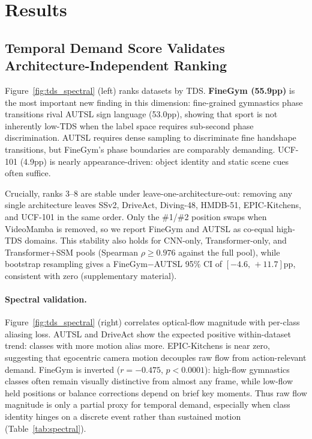 \documentclass[runningheads]{llncs}
\newcommand{\TDS}{\textsc{TDS}}
\begin{document}
\section{Results}
\label{sec:results}

\subsection{Temporal Demand Score Validates Architecture-Independent Ranking}
\label{sec:results_tds}

Figure~\ref{fig:tds_spectral} (left) ranks datasets by \TDS{}. \textbf{FineGym (55.9pp)} is the most important new finding in this dimension: fine-grained gymnastics phase transitions rival AUTSL sign language (53.0pp), showing that sport is not inherently low-\TDS{} when the label space requires sub-second phase discrimination. AUTSL requires dense sampling to discriminate fine handshape transitions, but FineGym's phase boundaries are comparably demanding. UCF-101 (4.9pp) is nearly appearance-driven: object identity and static scene cues often suffice.

Crucially, ranks 3--8 are stable under leave-one-architecture-out: removing any single architecture leaves SSv2, DriveAct, Diving-48, HMDB-51, EPIC-Kitchens, and UCF-101 in the same order. Only the \#1/\#2 position swaps when VideoMamba is removed, so we report FineGym and AUTSL as co-equal high-\TDS{} domains. This stability also holds for CNN-only, Transformer-only, and Transformer+SSM pools (Spearman $\rho\geq0.976$ against the full pool), while bootstrap resampling gives a FineGym$-$AUTSL 95\% CI of $[-4.6,\,+11.7]$pp, consistent with zero (supplementary material).

\paragraph{Spectral validation.}
Figure~\ref{fig:tds_spectral} (right) correlates optical-flow magnitude with per-class aliasing loss. AUTSL and DriveAct show the expected positive within-dataset trend: classes with more motion alias more. EPIC-Kitchens is near zero, suggesting that egocentric camera motion decouples raw flow from action-relevant demand. FineGym is inverted ($r=-0.475$, $p<0.0001$): high-flow gymnastics classes often remain visually distinctive from almost any frame, while low-flow held positions or balance corrections depend on brief key moments. Thus raw flow magnitude is only a partial proxy for temporal demand, especially when class identity hinges on a discrete event rather than sustained motion (Table~\ref{tab:spectral}).
\end{document}
